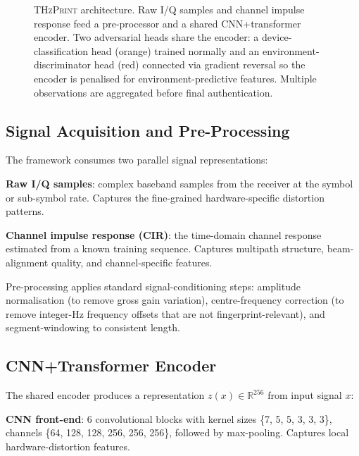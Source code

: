 \documentclass[sigconf,nonacm]{acmart}
\begin{document}
\begin{figure}[t]
\caption{\textsc{THzPrint} architecture. Raw I/Q samples and channel
  impulse response feed a pre-processor and a shared CNN+transformer
  encoder. Two adversarial heads share the encoder: a device-classification
  head (orange) trained normally and an environment-discriminator head
  (red) connected via gradient reversal so the encoder is penalised for
  environment-predictive features. Multiple observations are aggregated
  before final authentication.}
\label{fig:framework}
\end{figure}

\subsection{Signal Acquisition and Pre-Processing}

The framework consumes two parallel signal representations:

\textbf{Raw I/Q samples}: complex baseband samples from the
receiver at the symbol or sub-symbol rate. Captures the fine-grained
hardware-specific distortion patterns.

\textbf{Channel impulse response (CIR)}: the time-domain channel
response estimated from a known training sequence. Captures
multipath structure, beam-alignment quality, and channel-specific
features.

Pre-processing applies standard signal-conditioning steps: amplitude
normalisation (to remove gross gain variation), centre-frequency
correction (to remove integer-Hz frequency offsets that are not
fingerprint-relevant), and segment-windowing to consistent length.

\subsection{CNN+Transformer Encoder}

The shared encoder produces a representation $z(x) \in \mathbb{R}^{256}$
from input signal $x$:

\textbf{CNN front-end}: 6 convolutional blocks with kernel sizes
\{7, 5, 5, 3, 3, 3\}, channels \{64, 128, 128, 256, 256, 256\},
followed by max-pooling. Captures local hardware-distortion features.
\end{document}
